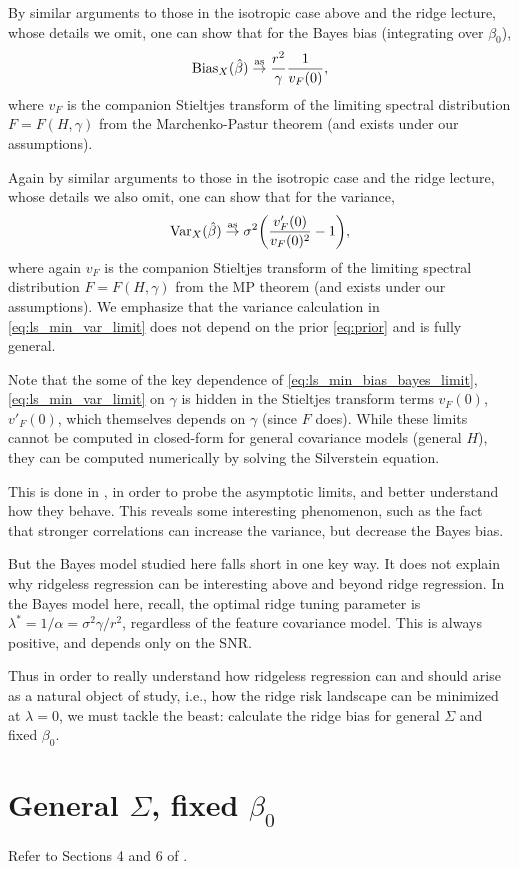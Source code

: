 \documentclass{article}
\begin{document}
By similar arguments to those in the isotropic case above and the ridge lecture,
whose details we omit, one can show that for the Bayes bias (integrating over 
$\beta_0$),  
\begin{equation}
\label{eq:ls_min_bias_bayes_limit}
\mathrm{Bias}_X(\hat{\beta}) \overset{\mathrm{as}}{\to} \frac{r^2}{\gamma} \frac{1}{v_F(0)},  
\end{equation}
where $v_F$ is the companion Stieltjes transform of the limiting spectral
distribution $F = F(H, \gamma)$ from the Marchenko-Pastur theorem (and
 exists under our assumptions).  

Again by similar arguments to those in the isotropic case and the ridge lecture,
whose details we also omit, one can show that for the variance,  
\begin{equation}
\label{eq:ls_min_var_limit}
\mathrm{Var}_X(\hat{\beta}) \overset{\mathrm{as}}{\to} \sigma^2 \bigg(\frac{v'_F(0)}{v_F(0)^2} - 1 \bigg),
\end{equation}
where again $v_F$ is the companion Stieltjes transform of the limiting spectral 
distribution $F = F(H, \gamma)$ from the MP theorem (and
 exists under our
assumptions). We emphasize that the variance calculation in
\eqref{eq:ls_min_var_limit} does not depend on the prior \eqref{eq:prior} and is
fully general.    

Note that the some of the key dependence of \eqref{eq:ls_min_bias_bayes_limit},
\eqref{eq:ls_min_var_limit} on $\gamma$ is hidden in the Stieltjes transform
terms $v_F(0)$, $v'_F(0)$, which themselves depends on $\gamma$ (since $F$
does). While these limits cannot be computed in closed-form for general
covariance models (general $H$), they can be computed numerically by solving the
Silverstein equation. 

This is done in \citet{hastie2022surprises}, in order to probe the asymptotic
limits, and better understand how they behave. This reveals some interesting
phenomenon, such as the fact that stronger correlations can increase the
variance, but decrease the Bayes bias.   

But the Bayes model studied here falls short in one key way. It does not explain
why ridgeless regression can be interesting above and beyond ridge
regression. In the Bayes model here, recall, the optimal ridge tuning parameter 
is $\lambda^* = 1/\alpha = \sigma^2 \gamma / r^2$, regardless of the feature
covariance model. This is always positive, and depends only on the SNR. 

Thus in order to really understand how ridgeless regression can and should
arise as a natural object of study, i.e., how the ridge risk landscape can be
minimized at $\lambda = 0$, we must tackle the beast: calculate the ridge bias
for general $\Sigma$ and fixed $\beta_0$.   

\section{General $\Sigma$, fixed $\beta_0$}

Refer to Sections 4 and 6 of \citet{hastie2022surprises}.



\end{document}
